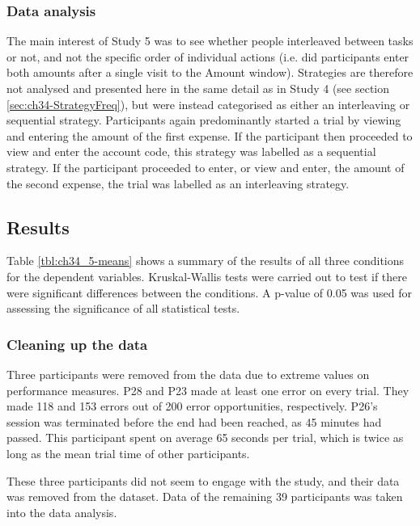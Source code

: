 \subsubsection{Data analysis}
The main interest of Study 5 was to see whether people interleaved between tasks or not, and not the specific order of individual actions (i.e. did participants enter both amounts after a single visit to the Amount window). Strategies are therefore not analysed and presented here in the same detail as in Study 4 (see section \ref{sec:ch34-StrategyFreq}), but were instead categorised as either an interleaving or sequential strategy. Participants again predominantly started a trial by viewing and entering the amount of the first expense. If the participant then proceeded to view and enter the account code, this strategy was labelled as a sequential strategy. If the participant proceeded to enter, or view and enter, the amount of the second expense, the trial was labelled as an interleaving strategy.

\subsection{Results}
Table \ref{tbl:ch34_5-means} shows a summary of the results of all three conditions for the dependent variables. Kruskal-Wallis tests were carried out to test if there were significant differences between the conditions. A p-value of 0.05 was used for assessing the significance of all statistical tests. 

\subsubsection{Cleaning up the data}
Three participants were removed from the data due to extreme values on performance measures.
P28 and P23 made at least one error on every trial. They made 118 and 153 errors out of 200 error opportunities, respectively. P26's session was terminated before the end had been reached, as 45 minutes had passed. This participant spent on average 65 seconds per trial, which is twice as long as the mean trial time of other participants.

These three participants did not seem to engage with the study, and their data was removed from the dataset. Data of the remaining 39 participants was taken into the data analysis.

